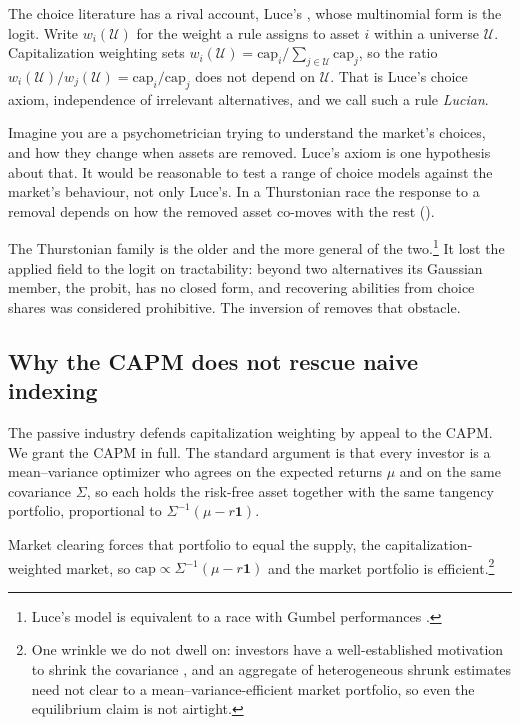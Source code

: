 The choice literature has a rival account, Luce's \parencite{luce1959}, whose
multinomial form is the logit. Write $w_i(\mathcal U)$ for the weight a rule assigns to asset $i$ within a
universe $\mathcal U$. Capitalization weighting sets $w_i(\mathcal U) =
\mathrm{cap}_i / \sum_{j\in\mathcal U}\mathrm{cap}_j$, so the ratio
$w_i(\mathcal U)/w_j(\mathcal U) = \mathrm{cap}_i/\mathrm{cap}_j$ does not depend on
$\mathcal U$. That is Luce's choice axiom, independence of irrelevant
alternatives, and we call such a rule \emph{Lucian}.

Imagine you are a psychometrician trying to understand the market's choices, and
how they change when assets are removed. Luce's axiom is one hypothesis about that.
It would be reasonable to test a range of choice models against the market's
behaviour, not only Luce's. In a Thurstonian race the response to a removal depends
on how the removed asset co-moves with the rest ().

The Thurstonian family is the older and the more general of the
two.\footnote{Luce's model is equivalent to a race with Gumbel performances
\parencite{yellott1977}.} It lost the applied field to the logit on tractability:
beyond two alternatives its Gaussian member, the probit, has no closed form, and
recovering abilities from choice shares was considered prohibitive. The inversion
of  removes that obstacle.

\subsection{Why the CAPM does not rescue naive indexing}
\label{sec:capm}

The passive industry defends capitalization weighting by appeal to the CAPM.
We
grant the CAPM in full.
The standard argument \parencite{sharpe1964} is that every
investor is a mean--variance optimizer who agrees on the expected returns $\mu$ and
on the same covariance $\Sigma$, so each holds the risk-free asset together with the
same tangency portfolio, proportional to $\Sigma^{-1}(\mu - r\mathbf{1})$.

Market
clearing forces that portfolio to equal the supply, the capitalization-weighted
market, so $\mathrm{cap} \propto \Sigma^{-1}(\mu - r\mathbf{1})$ and the market
portfolio is efficient.\footnote{One wrinkle we do not dwell on:
investors have a well-established motivation to shrink the covariance
\parencite{ledoitwolf2004}, and an aggregate of heterogeneous shrunk estimates
need not clear to a mean--variance-efficient market portfolio, so even the
equilibrium claim is not airtight.}

